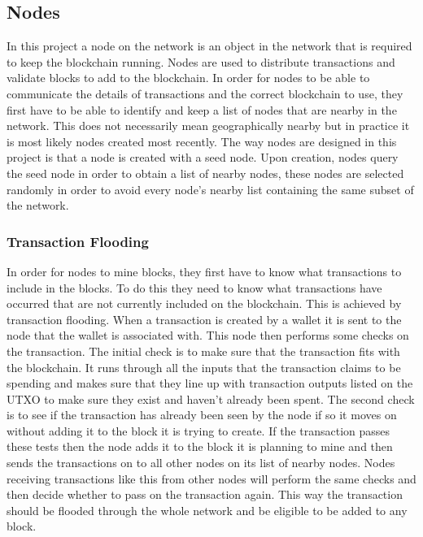 \documentclass{l4proj}
\begin{document}
\subsection{Nodes}
In this project a node on the network is an object in the network that is required to keep the blockchain 
running. Nodes are used to distribute transactions and validate blocks to add to the blockchain.
In order for nodes to be able to communicate the details of transactions and the correct blockchain to use,
they first have to be able to identify and keep a list of nodes that are nearby in the network. This does not
necessarily mean geographically nearby but in practice it is most likely nodes created most recently.
The way nodes are designed in this project is that a node is created with a seed node. Upon creation, nodes
query the seed node in order to obtain a list of nearby nodes, these nodes are selected randomly in order
to avoid every node's nearby list containing the same subset of the network.

\subsubsection{Transaction Flooding}
In order for nodes to mine blocks, they first have to know what transactions to include in the blocks. To do
this they need to know what transactions have occurred that are not currently included on the blockchain. This
is achieved by transaction flooding. When a transaction is created by a wallet it is sent to the node that the
wallet is associated with. This node then performs some checks on the transaction. The initial check is to make
sure that the transaction fits with the blockchain. It runs through all the inputs that the transaction claims
to be spending and makes sure that they line up with transaction outputs listed on the UTXO to make sure they
exist and haven't already been spent. The second check is to see if the transaction has already been seen by
the node if so it moves on without adding it to the block it is trying to create. If the transaction passes
these tests then the node adds it to the block it is planning to mine and then sends the transactions on to all
other nodes on its list of nearby nodes. Nodes receiving transactions like this from other nodes will perform the
same checks and then decide whether to pass on the transaction again. This way the transaction should be flooded
through the whole network and be eligible to be added to any block.
\end{document}
